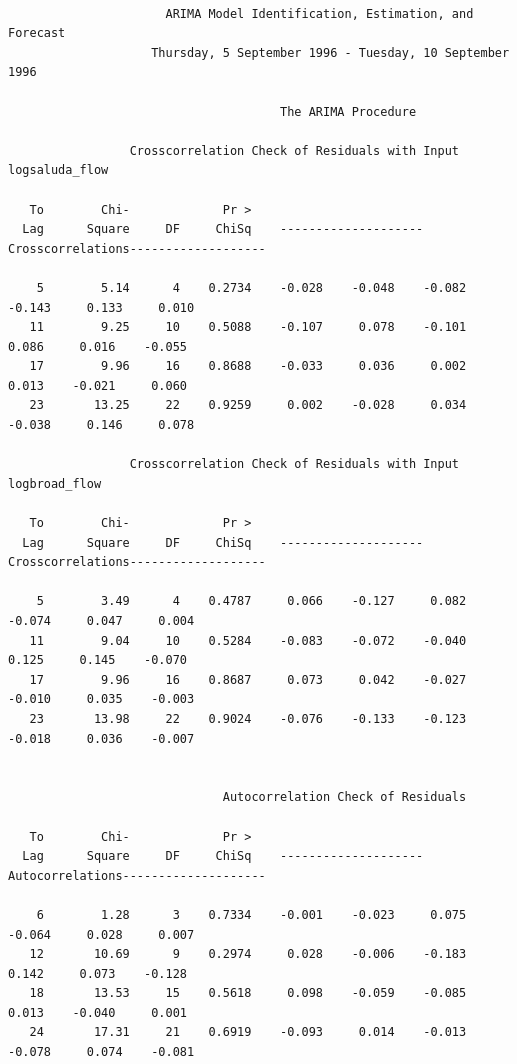 \documentclass[12pt]{report}
\begin{document}
\begin{table} \scriptsize
\begin{centering}
\begin{verbatim}

                      ARIMA Model Identification, Estimation, and Forecast
                    Thursday, 5 September 1996 - Tuesday, 10 September 1996

                                      The ARIMA Procedure

                 Crosscorrelation Check of Residuals with Input logsaluda_flow

   To        Chi-             Pr >
  Lag      Square     DF     ChiSq    --------------------Crosscorrelations-------------------

    5        5.14      4    0.2734    -0.028    -0.048    -0.082    -0.143     0.133     0.010
   11        9.25     10    0.5088    -0.107     0.078    -0.101     0.086     0.016    -0.055
   17        9.96     16    0.8688    -0.033     0.036     0.002     0.013    -0.021     0.060
   23       13.25     22    0.9259     0.002    -0.028     0.034    -0.038     0.146     0.078

                 Crosscorrelation Check of Residuals with Input logbroad_flow

   To        Chi-             Pr >
  Lag      Square     DF     ChiSq    --------------------Crosscorrelations-------------------

    5        3.49      4    0.4787     0.066    -0.127     0.082    -0.074     0.047     0.004
   11        9.04     10    0.5284    -0.083    -0.072    -0.040     0.125     0.145    -0.070
   17        9.96     16    0.8687     0.073     0.042    -0.027    -0.010     0.035    -0.003
   23       13.98     22    0.9024    -0.076    -0.133    -0.123    -0.018     0.036    -0.007


                              Autocorrelation Check of Residuals

   To        Chi-             Pr >
  Lag      Square     DF     ChiSq    --------------------Autocorrelations--------------------

    6        1.28      3    0.7334    -0.001    -0.023     0.075    -0.064     0.028     0.007
   12       10.69      9    0.2974     0.028    -0.006    -0.183     0.142     0.073    -0.128
   18       13.53     15    0.5618     0.098    -0.059    -0.085     0.013    -0.040     0.001
   24       17.31     21    0.6919    -0.093     0.014    -0.013    -0.078     0.074    -0.081

\end{verbatim}
\end{centering}
\normalsize\caption{Model Diagnostics for 5-10 September 1996
Streamflow }\label{tab:sepModDiag}
\end{table}
\end{document}

